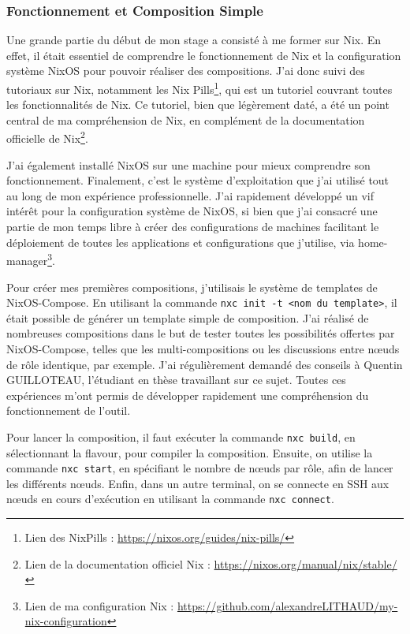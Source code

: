 \documentclass[a4paper,french,12pt, titlepage]{article}
\begin{document}
\hypertarget{fonctionnement-et-composition-simple}{%
\subsubsection{Fonctionnement et Composition
Simple}\label{fonctionnement-et-composition-simple}}

Une grande partie du début de mon stage a consisté à me former sur Nix.
En effet, il était essentiel de comprendre le fonctionnement de Nix et
la configuration système NixOS pour pouvoir réaliser des compositions.
J'ai donc suivi des tutoriaux sur Nix, notamment les Nix
Pills\footnote{Lien des NixPills : \url{https://nixos.org/guides/nix-pills/}},
qui est un tutoriel couvrant toutes les fonctionnalités de Nix. Ce
tutoriel, bien que légèrement daté, a été un point central de ma
compréhension de Nix, en complément de la documentation officielle de
Nix\footnote{Lien de la documentation officiel Nix : \url{https://nixos.org/manual/nix/stable/}}.\newline

J'ai également installé NixOS sur une machine pour mieux comprendre son
fonctionnement. Finalement, c'est le système d'exploitation que j'ai
utilisé tout au long de mon expérience professionnelle. J'ai rapidement
développé un vif intérêt pour la configuration système de NixOS, si bien
que j'ai consacré une partie de mon temps libre à créer des
configurations de machines facilitant le déploiement de toutes les
applications et configurations que j'utilise, via
home-manager\footnote{Lien de ma configuration Nix : \url{https://github.com/alexandreLITHAUD/my-nix-configuration}}.\newline

Pour créer mes premières compositions, j'utilisais le système de
templates de NixOS-Compose. En utilisant la commande
\texttt{nxc\ init\ -t\ \textless{}nom\ du\ template\textgreater{}}, il
était possible de générer un template simple de composition. J'ai
réalisé de nombreuses compositions dans le but de tester toutes les
possibilités offertes par NixOS-Compose, telles que les
multi-compositions ou les discussions entre nœuds de rôle identique, par
exemple. J'ai régulièrement demandé des conseils à Quentin GUILLOTEAU,
l'étudiant en thèse travaillant sur ce sujet. Toutes ces expériences
m'ont permis de développer rapidement une compréhension du
fonctionnement de l'outil.\newline

Pour lancer la composition, il faut exécuter la commande
\texttt{nxc\ build}, en sélectionnant la flavour, pour compiler la
composition. Ensuite, on utilise la commande \texttt{nxc\ start}, en
spécifiant le nombre de nœuds par rôle, afin de lancer les différents
nœuds. Enfin, dans un autre terminal, on se connecte en SSH aux nœuds en
cours d'exécution en utilisant la commande
\texttt{nxc\ connect}.\newline
\end{document}
